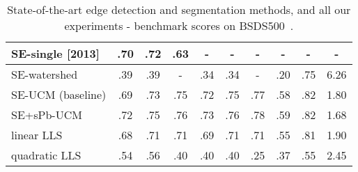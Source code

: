 \begin{table}[htbp]
\begin{tabular}{l|c|c|c||c|c|c||c|c|c|}
\hline
\hline
\multicolumn{1}{|l|}{\cite{DollarICCV13edges} SE-single [2013]} & .70 & .72 & .63 & - & - & - & - & - & - \\
\hline
\multicolumn{1}{|l|}{SE-watershed} & .39 & .39 & - & .34 & .34 & - & .20 & .75 & 6.26 \\
\hline
\multicolumn{1}{|l|}{SE-UCM (baseline)} & .69 &.73 & .75 & .72 & .75 & .77 & .58 & .82 & 1.80 \\
\hline
\multicolumn{1}{|l|}{SE+sPb-UCM} & .72 & .75 & .76 & .73 & .76 & .78 & .59 & .82 & 1.68 \\ %
\hline
\hline
\multicolumn{1}{|l|}{linear LLS} & .68 & .71 & .71 & .69 & .71 & .71 & .55 & .81 & 1.90 \\%
\hline
\multicolumn{1}{|l|}{quadratic LLS} & .54 & .56 & .40 & .40 & .40 & .25 & .37 & .55 & 2.45 \\
\hline
\hline
\end{tabular}
\caption[Benchmark scores for SoA and ours]{State-of-the-art edge detection and segmentation methods, and all our experiments - benchmark scores on BSDS500~\cite{BSDS500resources}.}
\label{tab:all-results}
\end{table}




